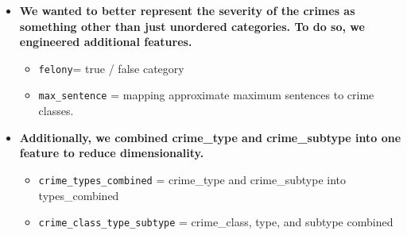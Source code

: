 \documentclass[11pt]{article}
\providecommand{\tightlist}{%
      \setlength{\itemsep}{0pt}\setlength{\parskip}{0pt}}
\begin{document}
\begin{itemize}
\tightlist
\item
  \textbf{We wanted to better represent the severity of the crimes as
  something other than just unordered categories. To do so, we
  engineered additional features.}

  \begin{itemize}
  \tightlist
  \item
    \texttt{felony}= true / false category
  \item
    \texttt{max\_sentence} = mapping approximate maximum sentences to
    crime classes.
  \end{itemize}
\item
  \textbf{Additionally, we combined crime\_type and crime\_subtype into
  one feature to reduce dimensionality.}

  \begin{itemize}
  \tightlist
  \item
    \texttt{crime\_types\_combined} = crime\_type and crime\_subtype
    into types\_combined
  \item
    \texttt{crime\_class\_type\_subtype} = crime\_class, type, and
    subtype combined
  \end{itemize}
\end{itemize}
\end{document}
